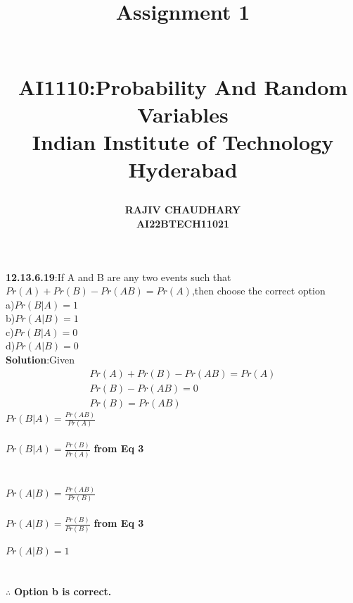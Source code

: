 \documentclass[12pt]{article}
\title{\begin{Huge}\textbf{Assignment 1}\end{Huge}\\
\textbf{AI1110}:Probability And Random Variables\\
Indian Institute of Technology Hyderabad}
\author{\textbf{RAJIV CHAUDHARY}\\
\textbf{AI22BTECH11021}}
\date{}
\begin{document}
\maketitle
\textbf{12.13.6.19}:If A and B are any two events such that $Pr(A)+Pr(B)-Pr(AB)=Pr(A)$,then choose the correct option \\
a)$Pr(B|A)=1$\\b)$Pr(A|B)=1$\\
c)$Pr(B|A)=0$\\d)$Pr(A|B)=0$\\
\textbf{Solution}:Given
\begin{align}
Pr(A)+Pr(B)-Pr(AB)=Pr(A)\\
Pr(B)-Pr(AB)=0\\
Pr(B)=Pr(AB)
\end{align}
$Pr(B|A)=\frac{Pr(AB)}{Pr(A)}$\\\\
$Pr(B|A)=\frac{Pr(B)}{Pr(A)}$  \textbf{from Eq 3}
\\\\\\
$Pr(A|B)=\frac{Pr(AB)}{Pr(B)}$\\\\
$Pr(A|B)=\frac{Pr(B)}{Pr(B)}$ \textbf{from Eq 3}\\\\
$Pr(A|B)=1$\\\\\\
$\therefore$ \textbf{Option b is correct.}
\end{document}
